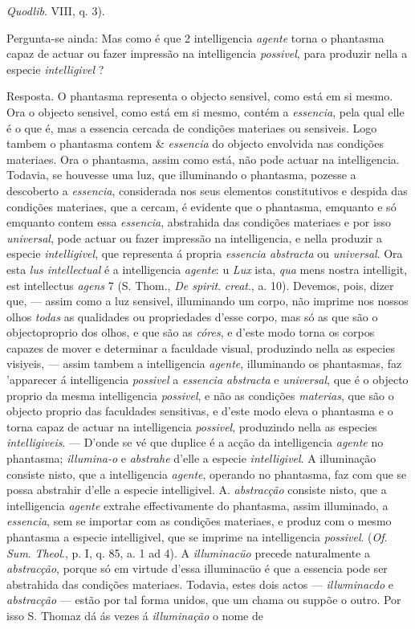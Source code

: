 \emph{Quodlib}. VIII, q. 3).\par Pergunta-se ainda: Mas como é que 2 intelligencia \emph{agente} torna o phantasma capaz de actuar ou fazer impressão na intelligencia \emph{possivel}, para produzir nella a especie \emph{intelligivel} ?\par Resposta. O phantasma representa o objecto sensivel, como está em si mesmo. Ora o objecto sensivel, como está em si mesmo, contém a \emph{essencia}, pela qual elle é o que é, mas a essencia cercada de condições materiaes ou sensiveis. Logo tambem o phantasma contem \& \emph{essencia} do objecto envolvida nas condições materiaes. Ora o phantasma, assim como está, não pode actuar na intelligencia. Todavia, se houvesse uma luz, que illuminando o phantasma, pozesse a descoberto a \emph{essencia}, considerada nos seus elementos constitutivos e despida das condições materiaes, que a cercam, é evidente que o phantasma, emquanto e só emquanto contem essa \emph{essencia}, abstrahida das condições materiaes e por isso \emph{universal}, pode actuar ou fazer impressão na intelligencia, e nella produzir a especie \emph{intelligivel}, que representa á propria \emph{essencia abstracta} ou \emph{universal}. Ora esta \emph{lus intellectual} é a intelligencia \emph{agente}: u \emph{Lux} ista, \emph{qua} mens nostra intelligit, est intellectus \emph{agens} 7 (S. Thom., \emph{De spirit}. \emph{creat}., a. 10). Devemos, pois, dizer que, --- assim como a luz sensivel, illuminando um corpo, não imprime nos nossos olhos \emph{todas} as qualidades ou propriedades d'esse corpo, mas só as que são o objectoproprio dos olhos, e que são as \emph{córes}, e d'este modo torna os corpos capazes de mover e determinar a faculdade visual, produzindo nella as especies visiyeis, --- assim tambem a intelligencia \emph{agente}, illuminando os phantasmas, faz 'apparecer á intelligencia \emph{possivel} a \emph{essencia abstracta} e \emph{universal}, que é o objecto proprio da mesma intelligencia \emph{possivel}, e não as condições \emph{materias}, que são o objecto proprio das faculdades sensitivas, e d'este modo eleva o phantasma e o torna capaz de actuar na intelligencia \emph{possivel}, produzindo nella as especies \emph{intelligiveis}. --- D'onde se vé que duplice é a acção da intelligencia \emph{agente} no phantasma; \emph{illumina-o} e \emph{abstrahe} d'elle a especie \emph{intelligivel}. A illuminação consiste nisto, que a intelligencia \emph{agente}, operando no phantasma, faz com que se possa abstrahir d'elle a especie intelligivel. A. \emph{abstracção} consiste nisto, que a intelligencia \emph{agente} extrahe effectivamente do phantasma, assim illuminado, a \emph{essencia}, sem se importar com as condições materiaes, e produz com o mesmo phantasma a especie intelligivel, que se imprime na intelligencia \emph{possivel}. (\emph{Of}. \emph{Sum}. \emph{Theol}., p. I, q. 85, a. 1 ad 4). A \emph{illuminacüo} precede naturalmente a \emph{abstracção}, porque só em virtude d'essa illuminacüo é que a essencia pode ser abstrahida das condições materiaes. Todavia, estes dois actos --- \emph{illwminacdo} e \emph{abstracção} --- estão por tal forma unidos, que um chama ou suppõe o outro. Por isso S. Thomaz dá ás vezes á \emph{illuminação} o nome de 